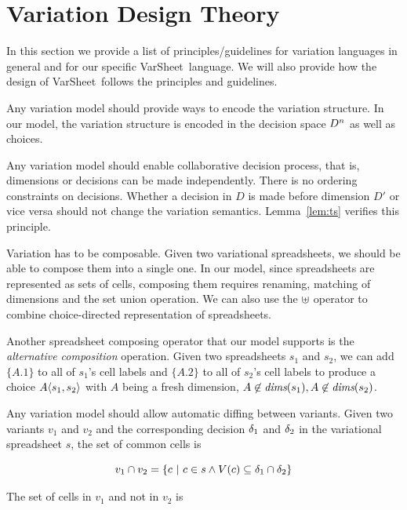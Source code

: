 \documentclass[conference]{IEEEtran}
\def\OB#1{\ifmmode#1\else\mbox{$#1$}\fi}
\newcommand{\set}[1]{\ensuremath{\{#1\}}}
\newcommand{\chcL}{\langle}
\newcommand{\chcR}{\rangle}
\newcommand{\chc}[2][D]{\OB{#1\chcL#2\chcR}}
\newcommand{\chcA}[1]{\chc[A]{#1}}
\newcommand{\dimset}[1][D]{\OB{#1^n}}
\newcommand{\dimsSym}{\textit{dims}}
\newcommand{\dims}[1]{\OB{\dimsSym(#1)}}
\newcommand{\dec}{\OB{\delta}}
\newcommand{\varsheet}{VarSheet}
\newcommand{\varSym}{\OB{V}}
\newcommand{\var}[1]{\varSym(#1)}
\begin{document}
\section{Variation Design Theory}
\label{sec:vardesign}

In this section we provide a list of principles/guidelines for variation languages in general and
for our specific \varsheet~language. We will also provide how the design of
\varsheet~follows the principles and guidelines.

\begin{inparaenum}[(1)]
\item Any variation model should provide ways to encode the variation structure.
In our model, the variation structure is encoded in the decision space $\dimset$ as well as choices.

\item Any variation model should enable collaborative decision process, that is, dimensions
or decisions can be made independently. There is no ordering constraints on decisions.
Whether a decision in $D$ is made before dimension $D'$ or vice versa should not change
the variation semantics. Lemma~\ref{lem:ts} verifies this principle.

\item Variation has to be composable. Given two variational spreadsheets, we should be
able to compose them into a single one. In our model, since spreadsheets are represented as
sets of cells, composing them requires renaming, matching of dimensions and the set
union operation. We can also use the $\unionchcsym$ operator to combine choice-directed
representation of spreadsheets.

Another spreadsheet composing operator that our model supports is the \emph{alternative composition}
operation. Given two spreadsheets $s_1$ and $s_2$, we can add $\set{A.1}$ to all of $s_1$'s
cell labels and $\set{A.2}$ to all of $s_2$'s cell labels to produce a choice $\chcA{s_1, s_2}$
with $A$ being a fresh dimension, $A \not\in \dims{s_1}, A \not\in \dims{s_2}$.

\item Any variation model should allow automatic diffing between variants. Given two variants
$v_1$ and $v_2$ and the corresponding decision $\dec_1$ and $\dec_2$ in the variational spreadsheet
$s$, the set of common cells is

\[v_1 \cap v_2 = \{ c \ |\ c \in s \wedge \var{c} \subseteq \dec_1 \cap \dec_2  \} \]

The set of cells in $v_1$ and not in $v_2$ is


\end{inparaenum}
\end{document}
